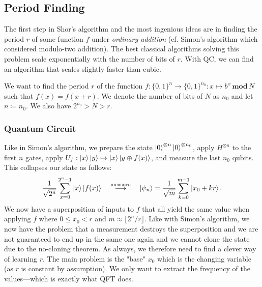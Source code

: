 		\subsection{Period Finding}
			The first step in Shor's algorithm and the most ingenious ideas are in finding the period \(r\) of some function \(f\) under \emph{ordinary addition} (cf. Simon's algorithm which considered modulo-two addition). The best classical algorithms solving this problem scale exponentially with the number of bits of \(r\). With \ac{QC}, we can find an algorithm that scales slightly faster than cubic.

			We want to find the period \(r\) of the function \( f : \{ 0, 1 \}^n \to \{ 0, 1 \}^{n_0} : x \mapsto b^x \,\mathbf{mod}\, N \) such that \( f(x) = f(x + r) \). We denote the number of bits of \(N\) as \(n_0\) and let \( n \coloneqq n_0 \). We also have \( 2^{n_0} > N > r \).

			\subsubsection{Quantum Circuit}
				Like in Simon's algorithm, we prepare the state \( \ket{0}^{\otimes n} \ket{0}^{\otimes n_0} \), apply \(H^{\otimes n}\) to the first \(n\) gates, apply \( U_f : \ket{x}\ket{y} \mapsto \ket{x}\ket{y \oplus f(x)} \), and measure the last \(n_0\) qubits. This collapses our state as follows:
				\begin{equation}
					\frac{1}{\sqrt{2^n}} \sum_{x = 0}^{2^n - 1} \ket{x}\ket{f(x)}
					\quad\overset{\text{measure}}{\longrightarrow}\quad
					\ket{\psi_n} = \frac{1}{\sqrt{m}} \sum_{k = 0}^{m - 1} \ket{x_0 + kr}.
				\end{equation}
				We now have a superposition of inputs to \(f\) that all yield the same value when applying \(f\) where \( 0 \leq x_0 < r \) and \( m \approx \lfloor 2^n / r \rfloor \). Like with Simon's algorithm, we now have the problem that a measurement destroys the superposition and we are not guaranteed to end up in the same one again and we cannot clone the state due to the no-cloning theorem. As always, we therefore need to find a clever way of learning \(r\). The main problem is the "base" \(x_0\) which is the changing variable (as \(r\) is constant by assumption). We only want to extract the frequency of the values---which is exactly what \ac{QFT} does.

